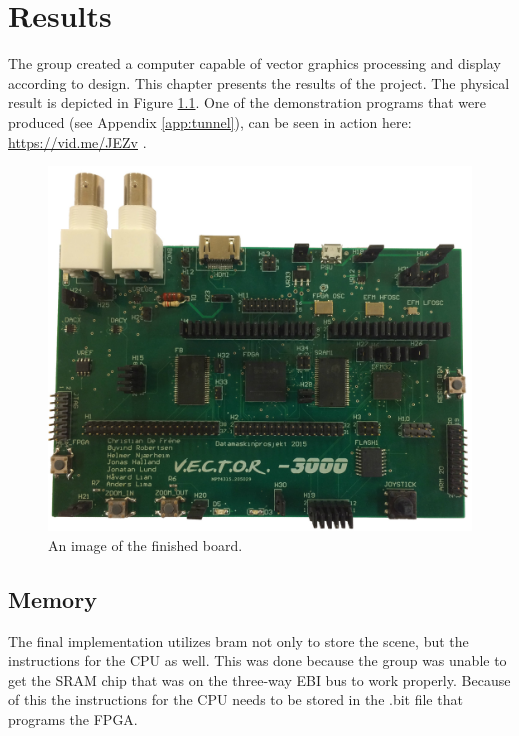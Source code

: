\chapter{Results}

The group created a computer capable of vector graphics processing and display according to design.
This chapter presents the results of the project.
The physical result is depicted in Figure \ref{fig:board-top}.
One of the demonstration programs that were produced (see Appendix \ref{app:tunnel}), can be seen in action here: \href{https://vid.me/JEZv}{https://vid.me/JEZv} \cite{tunnel-demo}.

\begin{figure}[h!]
	    \includegraphics[width=\linewidth]{images/board_top.jpg}
	    \caption{An image of the finished \vthreek board.}
	    \label{fig:board-top}
\end{figure}

\section{Memory}

The final implementation utilizes \gls{bram} not only to store the scene, but the instructions for the CPU as well.
This was done because the group was unable to get the SRAM chip that was on the three-way EBI bus to work properly.
Because of this the instructions for the CPU needs to be stored in the .bit file that programs the FPGA.

